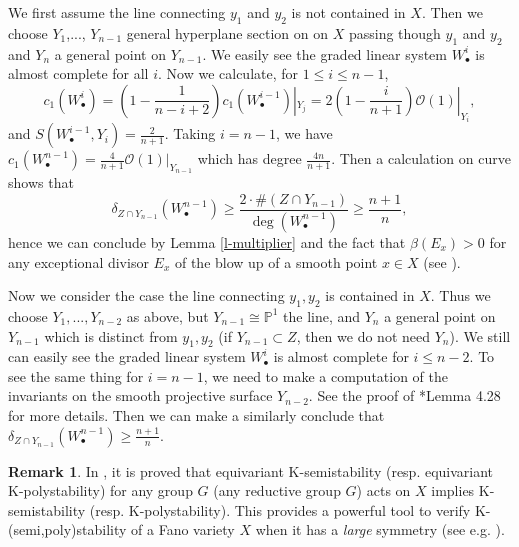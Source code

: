 \documentclass[12pt,reqno]{amsart}%
\theoremstyle{definition}
\newtheorem{rem}[thm]{Remark}
\theoremstyle{remark}
\begin{document}
We first assume the line connecting $y_1$ and $y_2$  is not contained in $X$. Then we choose  $Y_1$,..., $Y_{n-1}$ general hyperplane section on on $X$ passing though $y_1$ and $y_2$ and $Y_n$ a general point on $Y_{n-1}$. We easily see the graded linear system $W^i_{\bullet}$ is almost complete for all $i$. Now we calculate,  for $1\le i\le n-1$,
$$c_1(W^i_{\bullet})=(1-\frac{1}{n-i+2})c_1(W^{i-1}_{\bullet})|_{Y_j}=2(1-\frac{i}{n+1})\mathcal{O}(1)|_{Y_i},$$
 and $S(W^{i-1}_{\bullet}, Y_i)=\frac{2}{n+1}$.
Taking $i=n-1$, we have $c_1(W^{n-1}_{\bullet})=\frac{4}{n+1}\mathcal{O}(1)|_{Y_{n-1}}$ which has degree $\frac{4n}{n+1}$.
Then a calculation on curve shows that
$$\delta_{Z\cap Y_{n-1}}(W^{n-1}_{\bullet})\ge\frac{2\cdot \#(Z\cap Y_{n-1})}{\deg(W^{n-1}_{\bullet})}\ge\frac{n+1}{n},$$
hence we can conclude by Lemma \ref{l-multiplier} and the fact that $\beta(E_x)>0$ for any exceptional divisor $E_x$ of the blow up of a smooth point $x\in X$ (see \cite[Lemma 4.24]{AZ20}).


Now we consider the case the line connecting $y_1,y_2$ is contained in $X$. Thus we choose $Y_1,..., Y_{n-2}$ as above, but $Y_{n-1}\cong \mathbb{P}^1$ the line, and $Y_n$ a general point on $Y_{n-1}$ which is distinct from $y_1,y_2$ (if $Y_{n-1}\subset Z$, then we do not need $Y_n$). 
We still can easily see the graded linear system $W^i_{\bullet}$ is almost complete for $i\le n-2$.  To see the same thing for $i=n-1$, we need to make a computation of the invariants on the smooth projective surface $Y_{n-2}$. See the proof of \cite{AZ20}*{Lemma 4.28} for more details.
Then we can make a similarly conclude that $\delta_{Z\cap Y_{n-1}}(W^{n-1}_{\bullet})\ge\frac{n+1}{n}$.
\begin{rem}In \cite{Zhu20}, it is proved that equivariant K-semistability (resp. equivariant K-polystability) for any group $G$ (any reductive group $G$) acts on $X$ implies K-semistability (resp. K-polystability). This provides a powerful tool to verify K-(semi,poly)stability of a Fano variety $X$ when it has a {\it large} symmetry (see e.g. \cite{Del20}).
\end{rem}
 
\end{document}
